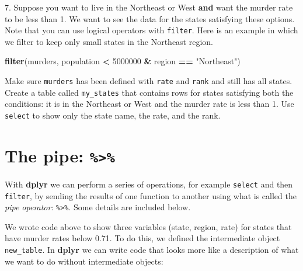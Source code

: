 \documentclass[
]{krantz}
\newenvironment{Shaded}{\begin{snugshade}}{\end{snugshade}}
\newcommand{\DecValTok}[1]{\textcolor[rgb]{0.06,0.06,0.06}{#1}}
\newcommand{\KeywordTok}[1]{\textcolor[rgb]{0.27,0.27,0.27}{\textbf{#1}}}
\newcommand{\NormalTok}[1]{#1}
\newcommand{\OperatorTok}[1]{\textcolor[rgb]{0.43,0.43,0.43}{\textbf{#1}}}
\newcommand{\StringTok}[1]{\textcolor[rgb]{0.5,0.5,0.5}{#1}}
\begin{document}
7. Suppose you want to live in the Northeast or West \textbf{and} want the murder rate to be less than 1. We want to see the data for the states satisfying these options. Note that you can use logical operators with \texttt{filter}. Here is an example in which we filter to keep only small states in the Northeast region.

\begin{Shaded}
\begin{Highlighting}[]
\KeywordTok{filter}\NormalTok{(murders, population }\OperatorTok{<}\StringTok{ }\DecValTok{5000000} \OperatorTok{&}\StringTok{ }\NormalTok{region }\OperatorTok{==}\StringTok{ "Northeast"}\NormalTok{)}
\end{Highlighting}
\end{Shaded}

Make sure \texttt{murders} has been defined with \texttt{rate} and \texttt{rank} and still has all states. Create a table called \texttt{my\_states} that contains rows for states satisfying both the conditions: it is in the Northeast or West and the murder rate is less than 1. Use \texttt{select} to show only the state name, the rate, and the rank.

\begin{Shaded}
\end{Shaded}

\hypertarget{the-pipe}{%
\section{\texorpdfstring{The pipe: \texttt{\%\textgreater{}\%}}{The pipe: \%\textgreater\%}}\label{the-pipe}}

With \textbf{dplyr} we can perform a series of operations, for example \texttt{select} and then \texttt{filter}, by sending the results of one function to another using what is called the \emph{pipe operator}: \texttt{\%\textgreater{}\%}. Some details are included below.

We wrote code above to show three variables (state, region, rate) for states that have murder rates below 0.71. To do this, we defined the intermediate object \texttt{new\_table}. In \textbf{dplyr} we can write code that looks more like a description of what we want to do without intermediate objects:
\end{document}
